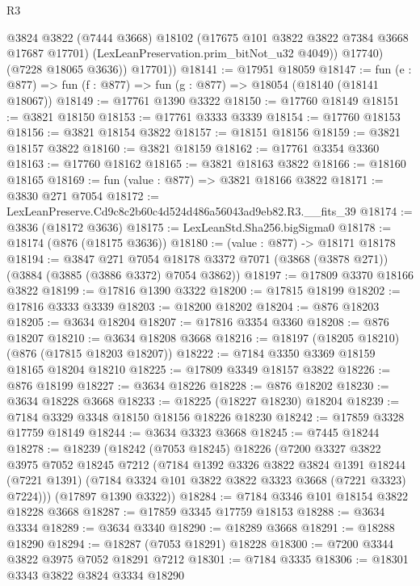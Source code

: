 \begin{lexlean}{R3}
\begin{coremodule}
              @3824
              @3822
              (@7444 @3668)
              @18102
              (@17675 @101 @3822 @3822 @7384 @3668 @17687 @17701)
              (LexLeanPreservation.prim_bitNot_u32 @4049))
            @17740)
          (@7228 @18065 @3636))
        @17701))
@18141 := @17951 @18059
@18147 := fun (e : @877) => fun (f : @877) => fun (g : @877) => @18054 (@18140 (@18141 @18067))
@18149 := @17761 @1390 @3322
@18150 := @17760 @18149
@18151 := @3821 @18150
@18153 := @17761 @3333 @3339
@18154 := @17760 @18153
@18156 := @3821 @18154 @3822
@18157 := @18151 @18156
@18159 := @3821 @18157 @3822
@18160 := @3821 @18159
@18162 := @17761 @3354 @3360
@18163 := @17760 @18162
@18165 := @3821 @18163 @3822
@18166 := @18160 @18165
@18169 := fun (value : @877) => @3821 @18166 @3822
@18171 := @3830 @271 @7054
@18172 := LexLeanPreserve.Cd9c8c2b60c4d524d486a56043ad9eb82.R3.__fits_39
@18174 := @3836 (@18172 @3636)
@18175 := LexLeanStd.Sha256.bigSigma0
@18178 := @18174 (@876 (@18175 @3636))
@18180 := (value : @877) -> @18171 @18178
@18194 := @3847
    @271
    @7054
    @18178
    @3372
    @7071
    (@3868 (@3878 @271))
    (@3884 (@3885 (@3886 @3372) @7054 @3862))
@18197 := @17809 @3370 @18166 @3822
@18199 := @17816 @1390 @3322
@18200 := @17815 @18199
@18202 := @17816 @3333 @3339
@18203 := @18200 @18202
@18204 := @876 @18203
@18205 := @3634 @18204
@18207 := @17816 @3354 @3360
@18208 := @876 @18207
@18210 := @3634 @18208 @3668
@18216 := @18197 (@18205 @18210) (@876 (@17815 @18203 @18207))
@18222 := @7184 @3350 @3369 @18159 @18165 @18204 @18210
@18225 := @17809 @3349 @18157 @3822
@18226 := @876 @18199
@18227 := @3634 @18226
@18228 := @876 @18202
@18230 := @3634 @18228 @3668
@18233 := @18225 (@18227 @18230) @18204
@18239 := @7184 @3329 @3348 @18150 @18156 @18226 @18230
@18242 := @17859 @3328 @17759 @18149
@18244 := @3634 @3323 @3668
@18245 := @7445 @18244
@18278 := @18239
    (@18242
      (@7053 @18245)
      @18226
      (@7200
        @3327
        @3822
        @3975
        @7052
        @18245
        @7212
        (@7184
          @1392
          @3326
          @3822
          @3824
          @1391
          @18244
          (@7221 @1391)
          (@7184 @3324 @101 @3822 @3822 @3323 @3668 (@7221 @3323) @7224)))
      (@17897 @1390 @3322))
@18284 := @7184 @3346 @101 @18154 @3822 @18228 @3668
@18287 := @17859 @3345 @17759 @18153
@18288 := @3634 @3334
@18289 := @3634 @3340
@18290 := @18289 @3668
@18291 := @18288 @18290
@18294 := @18287 (@7053 @18291) @18228
@18300 := @7200 @3344 @3822 @3975 @7052 @18291 @7212
@18301 := @7184 @3335
@18306 := @18301 @3343 @3822 @3824 @3334 @18290

\end{coremodule}
\end{lexlean}
